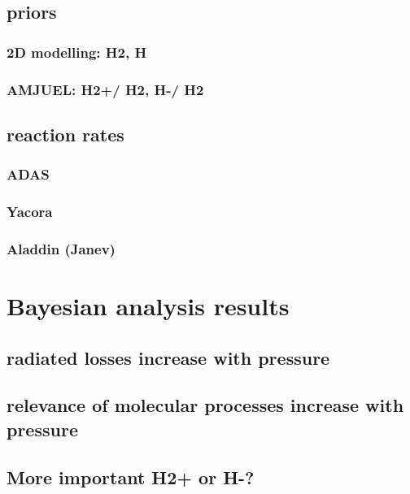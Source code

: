 \subsection{priors}
\subsubsection{2D modelling: H2, H}
\subsubsection{AMJUEL:  H2+/ H2, H-/ H2}
\subsection{reaction rates}
\subsubsection{ADAS}
\subsubsection{Yacora}
\subsubsection{Aladdin (Janev)}
\section{Bayesian analysis results}
\subsection{radiated losses increase with pressure}
\subsection{relevance of molecular processes increase with pressure}
 \subsection{More important H2+ or H-?}